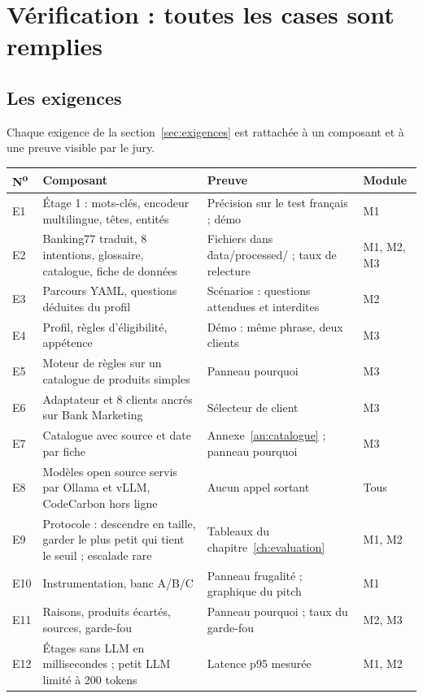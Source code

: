 \chapter{Vérification : toutes les cases sont remplies}
\label{ch:couverture}

\section{Les exigences}

Chaque exigence de la section~\ref{sec:exigences} est rattachée à un composant et à une preuve
visible par le jury.

\begin{center}\small
\begin{longtable}{@{}l L{4.6cm} L{4.6cm} l@{}}
\toprule
\textbf{N\textsuperscript{o}} & \textbf{Composant} & \textbf{Preuve} & \textbf{Module} \\
\midrule
\endhead
E1 & Étage 1 : mots-clés, encodeur multilingue, têtes, entités & Précision sur le test français ; démo &
  M1 \\
E2 & Banking77 traduit, 8 intentions, glossaire, catalogue, fiche de données & Fichiers dans
  \f{data/processed/} ; taux de relecture & M1, M2, M3 \\
E3 & Parcours YAML, questions déduites du profil & Scénarios : questions attendues et interdites
  & M2 \\
E4 & Profil, règles d'éligibilité, appétence & Démo : même phrase, deux clients & M3 \\
E5 & Moteur de règles sur un catalogue de produits simples & Panneau pourquoi & M3 \\
E6 & Adaptateur et 8 clients ancrés sur Bank Marketing & Sélecteur de client & M3 \\
E7 & Catalogue avec source et date par fiche & Annexe~\ref{an:catalogue} ; panneau pourquoi &
  M3 \\
E8 & Modèles open source servis par Ollama et vLLM, CodeCarbon hors ligne & Aucun appel
  sortant & Tous \\
E9 & Protocole : descendre en taille, garder le plus petit qui tient le seuil ; escalade rare & Tableaux du
  chapitre~\ref{ch:evaluation} & M1, M2 \\
E10 & Instrumentation, banc A/B/C & Panneau frugalité ; graphique du pitch & M1 \\
E11 & Raisons, produits écartés, sources, garde-fou & Panneau pourquoi ; taux du garde-fou &
  M2, M3 \\
E12 & Étages sans LLM en millisecondes ; petit LLM limité à 200 tokens & Latence p95 mesurée & M1, M2 \\

\end{longtable}
\end{center}
